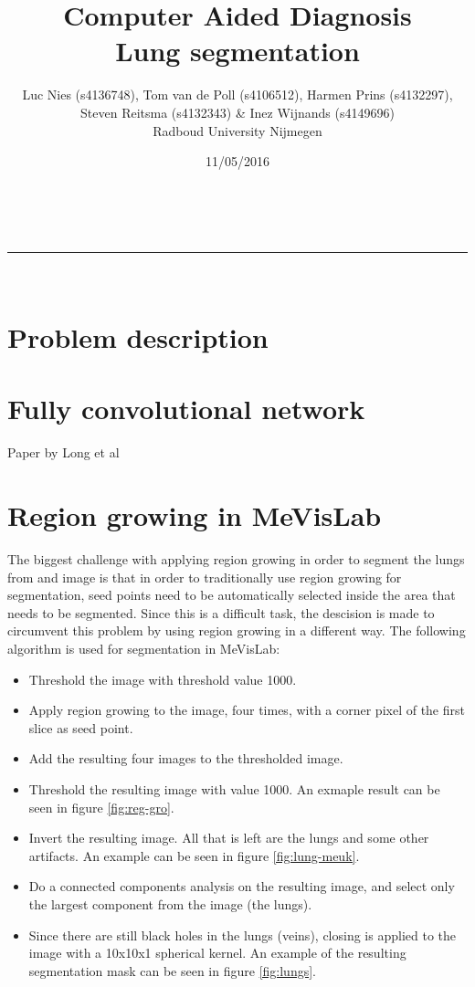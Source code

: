 \documentclass[a4paper,10pt]{article}
\makeatletter
\numberwithin{equation}{section} %
\numberwithin{figure}{section} %
\numberwithin{table}{section} %
\newcommand{\linia}{\rule{\linewidth}{0.5pt}}
\renewcommand{\maketitle}{
\begin{center}
\vspace{2ex}
{\huge \textsc{\@title}}
\vspace{1ex}
\\
\linia\\
\@author  \@date
\vspace{4ex}
\end{center}
}
\makeatother
\begin{document}
\title{Computer Aided Diagnosis \\\vspace{0.2cm} Lung segmentation}

\author{Luc Nies (s4136748), Tom van de Poll (s4106512), Harmen Prins (s4132297),\\ Steven Reitsma (s4132343) \& Inez Wijnands (s4149696)\\ Radboud University Nijmegen\\}

\date{11/05/2016}

\maketitle

\section{Problem description}

\section{Fully convolutional network}
Paper by Long et al \cite{long2015fully}

\section{Region growing in MeVisLab}
The biggest challenge with applying region growing in order to segment the lungs from and image is that in order to traditionally use region growing for segmentation, seed points need to be automatically selected inside the area that needs to be segmented. Since this is a difficult task, the descision is made to circumvent this problem by using region growing in a different way. The following algorithm is used for segmentation in MeVisLab:

\begin{itemize}
\item Threshold the image with threshold value 1000.
\item Apply region growing to the image, four times, with a corner pixel of the first slice as seed point.
\item Add the resulting four images to the thresholded image.
\item Threshold the resulting image with value 1000. An exmaple result can be seen in figure \ref{fig:reg-gro}.
\item Invert the resulting image. All that is left are the lungs and some other artifacts. An example can be seen in figure \ref{fig:lung-meuk}.
\item Do a connected components analysis on the resulting image, and select only the largest component from the image (the lungs).
\item Since there are still black holes in the lungs (veins), closing is applied to the image with a 10x10x1 spherical kernel. An example of the resulting segmentation mask can be seen in figure \ref{fig:lungs}.
\end{itemize}
\end{document}

